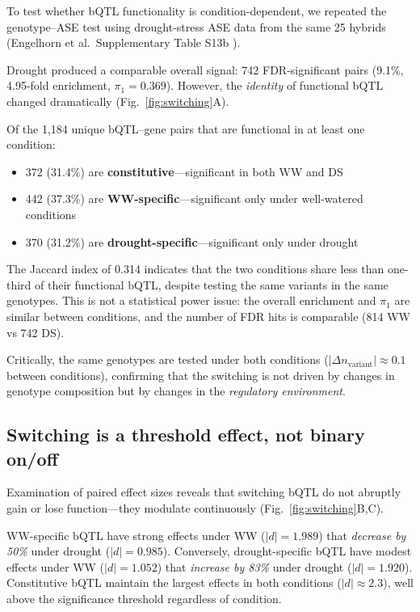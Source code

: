 \documentclass[10pt,letterpaper]{article}
\begin{document}
To test whether bQTL functionality is condition-dependent, we repeated the
genotype--ASE test using drought-stress ASE data from the same 25 hybrids
(Engelhorn et al.\ Supplementary Table S13b \cite{engelhorn2025}).

Drought produced a comparable overall signal: 742 FDR-significant pairs
(9.1\%, 4.95-fold enrichment, $\pi_1 = 0.369$). However, the
\emph{identity} of functional bQTL changed dramatically
(Fig.~\ref{fig:switching}A).

Of the 1,184 unique bQTL--gene pairs that are functional in at least one
condition:
\begin{itemize}
  \item 372 (31.4\%) are \textbf{constitutive}---significant in both WW and DS
  \item 442 (37.3\%) are \textbf{WW-specific}---significant only under
        well-watered conditions
  \item 370 (31.2\%) are \textbf{drought-specific}---significant only under
        drought
\end{itemize}

The Jaccard index of 0.314 indicates that the two conditions share less than
one-third of their functional bQTL, despite testing the same variants in the
same genotypes. This is not a statistical power issue: the overall enrichment
and $\pi_1$ are similar between conditions, and the number of FDR hits is
comparable (814 WW vs 742 DS).

Critically, the same genotypes are tested under both conditions
($|\Delta n_\text{variant}| \approx 0.1$ between conditions), confirming
that the switching is not driven by changes in genotype composition but by
changes in the \emph{regulatory environment}.

\subsection*{Switching is a threshold effect, not binary on/off}

Examination of paired effect sizes reveals that switching bQTL do not
abruptly gain or lose function---they modulate continuously
(Fig.~\ref{fig:switching}B,C).

WW-specific bQTL have strong effects under WW ($|d| = 1.989$) that
\emph{decrease by 50\%} under drought ($|d| = 0.985$). Conversely,
drought-specific bQTL have modest effects under WW ($|d| = 1.052$) that
\emph{increase by 83\%} under drought ($|d| = 1.920$). Constitutive bQTL
maintain the largest effects in both conditions ($|d| \approx 2.3$),
well above the significance threshold regardless of condition.
\end{document}
